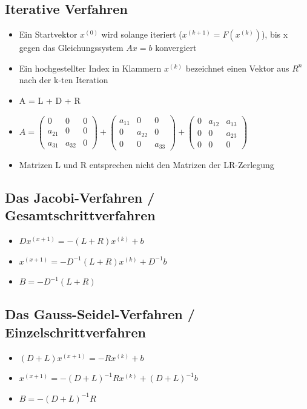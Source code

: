 \documentclass[8pt,a4paper]{scrartcl}
\begin{document}
\begin{multicols*}{3}
			\subsection{Iterative Verfahren}
				\begin{itemize}\itemsep0pt	
					\item Ein Startvektor $x^{(0)}$ wird solange iteriert ($x^{(k+1)} = F(x^{(k)})$), bis x gegen das Gleichungssystem $Ax = b$ konvergiert
					\item Ein hochgestellter Index in Klammern $x^{(k)}$ bezeichnet einen Vektor aus $R^{n}$ nach der k-ten Iteration
					\item A = L + D + R
					\item $A = \begin{pmatrix}0&0&0\\a_{21}&0&0\\a_{31}&a_{32}&0\end{pmatrix} + \begin{pmatrix}a_{11}&0&0\\0&a_{22}&0\\0&0&a_{33}\end{pmatrix} + \begin{pmatrix}0&a_{12}&a_{13}\\0&0&a_{23}\\0&0&0\end{pmatrix}$
					\item Matrizen L und R entsprechen nicht den Matrizen der LR-Zerlegung
				\end{itemize}


			\subsection{Das Jacobi-Verfahren / Gesamtschrittverfahren}
				\begin{itemize}\itemsep0pt	
					\item $Dx^{(x+1)} = -(L+R)x^{(k)} + b$
					\item $x^{(x+1)} = -D^{-1}(L+R)x^{(k)} + D^{-1}b$
					\item $B = -D^{-1}(L+R)$
				\end{itemize}
			
			\subsection{Das Gauss-Seidel-Verfahren / Einzelschrittverfahren}
				\begin{itemize}\itemsep0pt	
					\item $(D+L)x^{(x+1)} = -Rx^{(k)} + b$
					\item $x^{(x+1)} = -(D+L)^{-1}Rx^{(k)} + (D+L)^{-1}b$
					\item $B = -(D+L)^{-1}R$
				\end{itemize}
		

\end{multicols*}
\end{document}
